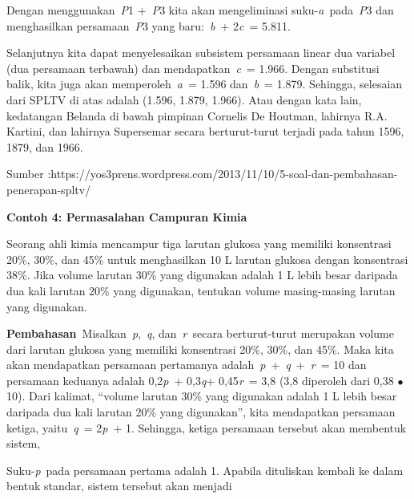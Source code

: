 \documentclass[11pt,fleqn]{book} %
\begin{document}
\noindent 

\noindent 

\noindent Dengan menggunakan~\textit{P}1 +~\textit{P}3 kita akan mengeliminasi suku-\textit{a}~pada~\textit{P}3 dan menghasilkan persamaan~\textit{P}3 yang baru:~\textit{b}~+ 2\textit{c}~= 5.811.

\noindent 

\noindent Selanjutnya kita dapat menyelesaikan subsistem persamaan linear dua variabel (dua persamaan terbawah) dan mendapatkan~\textit{c}~= 1.966. Dengan substitusi balik, kita juga akan memperoleh~\textit{a}~= 1.596 dan~\textit{b}~= 1.879. Sehingga, selesaian dari SPLTV di atas adalah (1.596, 1.879, 1.966). Atau dengan kata lain, kedatangan Belanda di bawah pimpinan Cornelis De Houtman, lahirnya R.A. Kartini, dan lahirnya Supersemar secara berturut-turut terjadi pada tahun 1596, 1879, dan 1966.

\noindent Sumber :https://yos3prens.wordpress.com/2013/11/10/5-soal-dan-pembahasan-penerapan-spltv/

\noindent 

\noindent \textbf{Contoh 4: Permasalahan Campuran Kimia}

\noindent Seorang ahli kimia mencampur tiga larutan glukosa yang memiliki konsentrasi 20\%, 30\%, dan 45\% untuk menghasilkan 10 L larutan glukosa dengan konsentrasi 38\%. Jika volume larutan 30\% yang digunakan adalah 1 L lebih besar daripada dua kali larutan 20\% yang digunakan, tentukan volume masing-masing larutan yang digunakan.

\noindent 

\noindent \textbf{Pembahasan}~Misalkan~\textit{p},~\textit{q}, dan~\textit{r}~secara berturut-turut merupakan volume dari larutan glukosa yang memiliki konsentrasi 20\%, 30\%, dan 45\%. Maka kita akan mendapatkan persamaan pertamanya adalah~\textit{p}~+~\textit{q}~+~\textit{r}~= 10 dan persamaan keduanya adalah 0,2\textit{p}~+ 0,3\textit{q}+ 0,45\textit{r}~= 3,8 (3,8 diperoleh dari 0,38 $\mathrm{\bullet}$ 10). Dari kalimat, ``volume larutan 30\% yang digunakan adalah 1 L lebih besar daripada dua kali larutan 20\% yang digunakan'', kita mendapatkan persamaan ketiga, yaitu~\textit{q}~= 2\textit{p}~+ 1. Sehingga, ketiga persamaan tersebut akan membentuk sistem,

\noindent 

\noindent Suku-\textit{p}~pada persamaan pertama adalah 1. Apabila dituliskan kembali ke dalam bentuk standar, sistem tersebut akan menjadi

\noindent 
\end{document}

